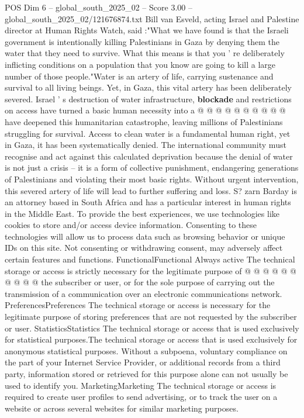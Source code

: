 \begin{textsample}{POS Dim 6 – global\_south\_2025\_02 – Score 3.00 – global\_south\_2025\_02/121676874.txt}
Bill van Esveld, acting Israel and Palestine director at Human Rights Watch, said :"What we have found is that the Israeli government is intentionally killing Palestinians in Gaza by denying them the water that they need to survive.
What this means is that you ' re deliberately inflicting conditions on a population that you know are going to kill a large number of those people."Water is an artery of life, carrying sustenance and survival to all living beings.
Yet, in Gaza, this vital artery has been deliberately severed.
Israel ' s destruction of water infrastructure, \textbf{blockade} and restrictions on access have turned a basic human necessity into a @ @ @ @ @ @ @ @ @ @ have deepened this humanitarian catastrophe, leaving millions of Palestinians struggling for survival.
Access to clean water is a fundamental human right, yet in Gaza, it has been systematically denied.
The international community must recognise and act against this calculated deprivation because the denial of water is not just a crisis -- it is a form of collective punishment, endangering generations of Palestinians and violating their most basic rights.
Without urgent intervention, this severed artery of life will lead to further suffering and loss.
S? zarn Barday is an attorney based in South Africa and has a particular interest in human rights in the Middle East.
To provide the best experiences, we use technologies like cookies to store and/or access device information.
Consenting to these technologies will allow us to process data such as browsing behavior or unique IDs on this site.
Not consenting or withdrawing consent, may adversely affect certain features and functions.
FunctionalFunctional Always active The technical storage or access is strictly necessary for the legitimate purpose of @ @ @ @ @ @ @ @ @ @ the subscriber or user, or for the sole purpose of carrying out the transmission of a communication over an electronic communications network.
PreferencesPreferences The technical storage or access is necessary for the legitimate purpose of storing preferences that are not requested by the subscriber or user.
StatisticsStatistics The technical storage or access that is used exclusively for statistical purposes.The technical storage or access that is used exclusively for anonymous statistical purposes.
Without a subpoena, voluntary compliance on the part of your Internet Service Provider, or additional records from a third party, information stored or retrieved for this purpose alone can not usually be used to identify you.
MarketingMarketing The technical storage or access is required to create user profiles to send advertising, or to track the user on a website or across several websites for similar marketing purposes.

\end{textsample}

